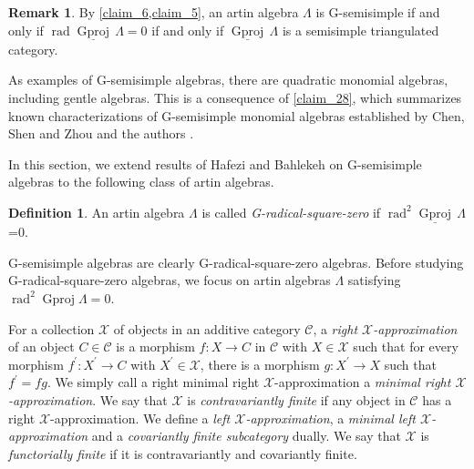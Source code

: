 \documentclass[12pt]{amsart}
\numberwithin{equation}{subsection}
\theoremstyle{plain}
\theoremstyle{definition}
\newtheorem{definition}[theorem]{Definition}
\newtheorem{remark}[theorem]{Remark}
\newcommand{\rad}{\operatorname{rad}}
\newcommand{\Gproj}{\operatorname{Gproj}}
\newcommand{\sGproj}{\underline{\operatorname{Gproj}}\,}
\renewcommand{\L}{\Lambda}
\newcommand{\C}{\mathcal{C}}
\newcommand{\X}{\mathcal{X}}
\begin{document}
\begin{remark} \label{remark_2}
By \cref{claim_6,claim_5}, an artin algebra $\L$ is G-semisimple if and only if $\rad\sGproj\L = 0$ if and only if $\sGproj\L$ is a semisimple triangulated category.
\end{remark}




As examples of G-semisimple algebras, there are quadratic monomial algebras, including gentle algebras.
This is a consequence of \cref{claim_28}, which summarizes known characterizations of G-semisimple monomial algebras established by Chen, Shen and Zhou \cite{Chen-Shen-Zhou_2018} and the authors \cite{Honma-Usui_2025}.










In this section, we extend results of Hafezi and Bahlekeh \cite[Section 3]{Hafezi-Bahlekeh_2024} on G-semisimple algebras to the following class of artin algebras.



\begin{definition}
An artin algebra $\L$ is called {\it G-radical-square-zero} if $\rad^2\sGproj\L$=0.
\end{definition}




G-semisimple algebras are clearly G-radical-square-zero algebras.
Before studying G-radical-square-zero algebras, we focus on artin algebras $\L$ satisfying $\rad^2\Gproj\L = 0$.





For a collection $\X$ of objects in an additive category $\C$, a {\it right $\X$-approximation} of an object $C\in\C$ is a morphism $f : X \to C$ in $\C$ with $X \in \X$ such that for every morphism $f^\prime : X^\prime \to C$ with $X^\prime\in\X$, there is a morphism $g : X^\prime \to X$ such that $f^\prime = fg$.
We simply call a right minimal right $\X$-approximation a {\it minimal right $\X$-approximation}.
We say that $\X$ is {\it contravariantly finite} if any object in $\C$ has a right $\X$-approximation. 
We define a {\it left $\X$-approximation}, a  {\it minimal left $\X$-approximation} and a {\it covariantly finite subcategory} dually. 
We say that $\X$ is {\it functorially finite} if it is contravariantly and covariantly finite.
\end{document}
